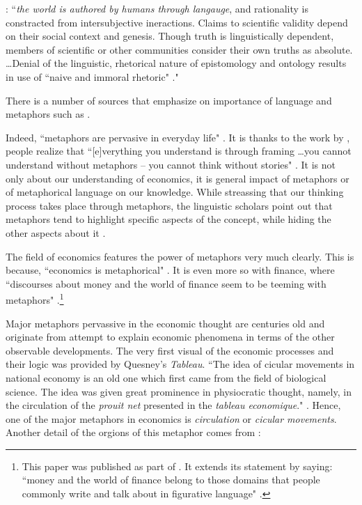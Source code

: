 \citep[p.~ 376, emphasis original]{gilbert1989}: ``\textit{the world is authored by humans through langauge}, and rationality is constracted from intersubjective ineractions. Claims to scientific validity depend on their social context and genesis. Though truth is linguistically dependent, members of scientific or other communities consider their own truths as absolute. \dots Denial of the linguistic, rhetorical nature of epistomology and ontology results in use of ``naive and immoral rhetoric" \cite[p.~88]{brown1987}."

There is a number of sources that emphasize on importance of language and metaphors such as \citep{brown1987,klamer1994,alborn1994,mirowski1994,lakoff1980}. 

Indeed, ``metaphors are pervasive in everyday life" \citep[p.~3]{lakoff1980}. It is thanks to the work by \citeauthor{lakoff1980}, people realize that ``[e]verything you understand is through framing \dots you cannot understand without metaphors -- you cannot think without stories" \citep[p.~290]{wray2015}. It is not only about our understanding of economics, it is general impact of metaphors or of metaphorical language on our knowledge. While streassing that our thinking process takes place through metaphors, the linguistic scholars point out that metaphors tend to highlight specific aspects of the concept, while hiding the other aspects about it \citep[p.~10]{lakoff1980}. 

The field of economics features the power of metaphors very much clearly. This is because, ``economics is metaphorical" \citep[p.~44]{klamer1994}. It is even more so with finance, where ``discourses about money and the world of finance seem to be teeming with metaphors" \citep[p.~49]{nunning2015}.\footnote{This paper was published as part of \cite{gil2015}. It extends its statement by saying: ``money and the world of finance belong to those domains that people commonly write and talk about in figurative language" \citep[p.~49]{nunning2015}.}

Major metaphors pervassive in the economic thought are centuries old and originate from attempt to explain economic phenomena in terms of the other observable developments. The very first visual of the economic processes and their logic was provided by Quesney's \textit{Tableau}. ``The idea of cicular movements in national economy is an old one which first came from the field of biological science. The idea was given great prominence in physiocratic thought, namely, in the circulation of the \textit{prouit net} presented in the \textit{tableau economique}." \citep[p.~160, emphasis original]{zweig1950}. Hence, one of the major metaphors in economics is \textit{circulation} or \textit{cicular movements}. Another detail of the orgions of this metaphor comes from \citeauthor{walker2020}:

